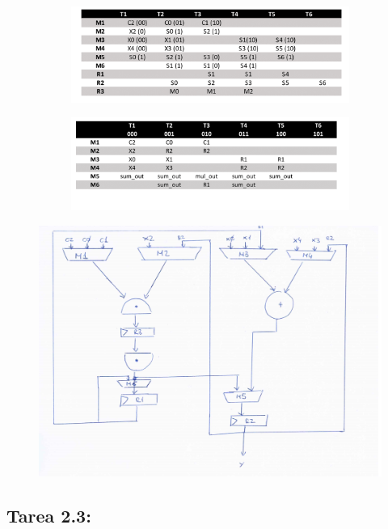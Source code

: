 \documentclass{article}
\begin{document}
\begin{figure}[H]
\centering
\begin{subfigure}{.5\textwidth}
  \includegraphics[width=1\linewidth]{images/2_2_5.png}
  \label{fig:sub1}
\end{subfigure}%
\begin{subfigure}{.6\textwidth}
  \includegraphics[width=1\linewidth]{images/2_2_6.png}
  \label{fig:sub2}
\end{subfigure}
\end{figure}

\begin{figure}[H]
\centering
\includegraphics[width=1\linewidth]{images/2_2_7.png}
\end{figure}
\subsection{Tarea 2.3:}
\end{document}
